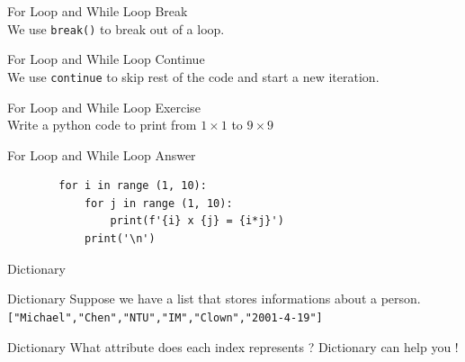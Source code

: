 \documentclass{beamer}
\begin{document}
    \begin{frame}{For Loop and While Loop}
        \color{blue} \Large Break \\
        \color{black} \normalsize \vskip 5pt
        We use \texttt{break()} to break out of a loop. \\
    \end{frame}
    
    \begin{frame}{For Loop and While Loop}
        \color{blue} \Large Continue \\
        \color{black} \normalsize \vskip 5pt
        We use \texttt{continue} to skip rest of the code and start a new iteration. \\
    \end{frame}
    
    \begin{frame}{For Loop and While Loop}
        \color{blue} \Large Exercise \\
        \color{black} \normalsize \vskip 5pt
        Write a python code to print from $1 \times 1$ to $9 \times 9$
    \end{frame}
    
    \begin{frame}[fragile]{For Loop and While Loop}
        \color{blue} \Large Answer \\
        \color{black} \normalsize \vskip 5pt
        \begin{verbatim}
        for i in range (1, 10):
            for j in range (1, 10):
                print(f'{i} x {j} = {i*j}')
            print('\n')
        \end{verbatim}
    \end{frame}

    \begin{frame}
        \begin{center}
            \color{blue} \LARGE Dictionary
        \end{center}
    \end{frame}

    \begin{frame}{Dictionary}
        Suppose we have a list that stores informations about a person. \\
        \texttt{["Michael","Chen","NTU","IM","Clown","2001-4-19"]}
    \end{frame}

    \begin{frame}{Dictionary}
        What attribute does each index represents ?
        \vskip 20pt 
        Dictionary can help you !
    \end{frame}
\end{document}
